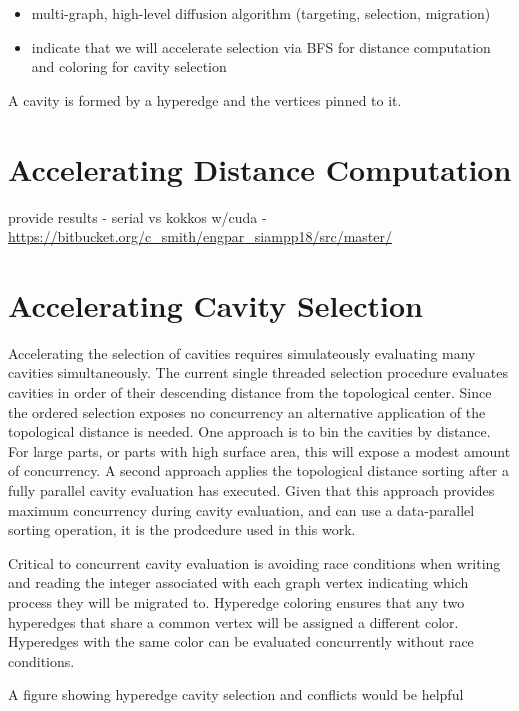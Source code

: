\documentclass[graybox]{svmult}
\begin{document}
\begin{itemize}
  \item multi-graph, high-level diffusion algorithm (targeting, selection, migration)
  \item indicate that we will accelerate selection via BFS for distance computation and coloring for cavity selection
\end{itemize}

A cavity is formed by a hyperedge and the vertices pinned to it.

\section{Accelerating Distance Computation} \label{sec:dist}

provide results - serial vs kokkos w/cuda -
\url{https://bitbucket.org/c_smith/engpar_siampp18/src/master/}

\section{Accelerating Cavity Selection} \label{sec:select}

Accelerating the selection of cavities requires simulateously evaluating many
cavities simultaneously.
The current single threaded selection procedure evaluates cavities in order of
their descending distance from the topological center.
Since the ordered selection exposes no concurrency an alternative application of
the topological distance is needed.
One approach is to bin the cavities by distance.
For large parts, or parts with high surface area, this will expose a modest
amount of concurrency.
A second approach applies the topological distance sorting after a fully
parallel cavity evaluation has executed.
Given that this approach provides maximum concurrency during cavity evaluation,
and can use a data-parallel sorting operation, it is the prodcedure used in this
work.

Critical to concurrent cavity evaluation is avoiding race conditions when
writing and reading the integer associated with each graph vertex indicating
which process they will be migrated to.
Hyperedge coloring ensures that any two hyperedges that share a common vertex
will be assigned a different color.
Hyperedges with the same color can be evaluated concurrently without
race conditions.

{\color{red}A figure showing hyperedge cavity selection and conflicts would be
helpful}
\end{document}
